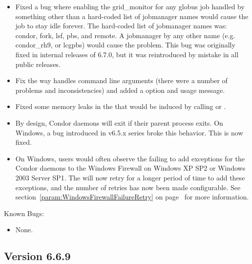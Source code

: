 \begin{itemize}

\item Fixed a bug where enabling the grid\_monitor for any globus
job handled by something other than a hard-coded list of jobmanager names
would cause the job to stay idle forever.  The hard-coded list of
jobmanager names was: condor, fork, lsf, pbs, and remote.  A jobmanager
by any other name (e.g. condor\_rh9, or lcgpbs) would cause the problem.
This bug was originally fixed in internal releases of 6.7.0, but it was
reintroduced by mistake in all public releases.

\item Fix the way  handles command line arguments
  (there were a number of problems and inconsistencies) and added a
   option and usage message.

\item Fixed some memory leaks in the  that would be
induced by calling  or  .

\item By design, Condor daemons will exit if their parent process
exits. On Windows, a bug introduced in v6.5.x series broke this
behavior. This is now fixed.

\item On Windows, users would often observe the  failing to
add exceptions for the Condor daemons to the Windows Firewall on Windows
XP SP2 or Windows 2003 Server SP1. The  will
now retry for a longer period of time to add these exceptions,
and the number of retries has now been made configurable. See
section~\ref{param:WindowsFirewallFailureRetry} on
page~\pageref{param:WindowsFirewallFailureRetry} for more information.

\end{itemize}

\noindent Known Bugs:

\begin{itemize}

\item None.

\end{itemize}

\subsection{\label{sec:New-6-6-9}Version 6.6.9}

